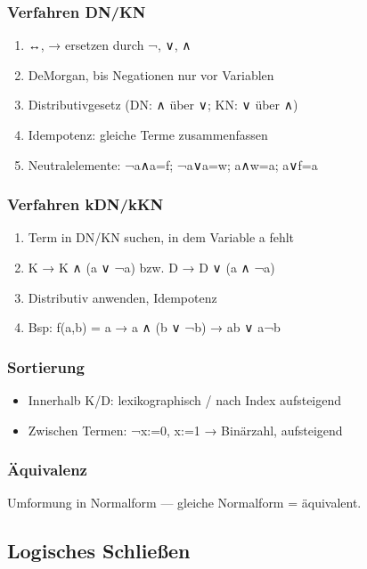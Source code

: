 \documentclass[11pt, a4paper]{article}
\begin{document}
\subsubsection{Verfahren DN/KN}
\begin{enumerate}
  \item ↔, → ersetzen durch ¬, ∨, ∧
  \item DeMorgan, bis Negationen nur vor Variablen
  \item Distributivgesetz (DN: ∧ über ∨; KN: ∨ über ∧)
  \item Idempotenz: gleiche Terme zusammenfassen
  \item Neutralelemente: ¬a∧a=f; ¬a∨a=w; a∧w=a; a∨f=a
\end{enumerate}


\subsubsection{Verfahren kDN/kKN}
\begin{enumerate}
  \item Term in DN/KN suchen, in dem Variable a fehlt
  \item K → K ∧ (a ∨ ¬a) bzw. D → D ∨ (a ∧ ¬a)
  \item Distributiv anwenden, Idempotenz
  \item Bsp: f(a,b) = a → a ∧ (b ∨ ¬b) → ab ∨ a¬b
\end{enumerate}


\subsubsection{Sortierung}
\begin{itemize}
  \item Innerhalb K/D: lexikographisch / nach Index aufsteigend
  \item Zwischen Termen: ¬x:=0, x:=1 → Binärzahl, aufsteigend
\end{itemize}


\subsubsection{Äquivalenz}
Umformung in Normalform — gleiche Normalform = äquivalent.



\subsection{Logisches Schließen}
\end{document}

